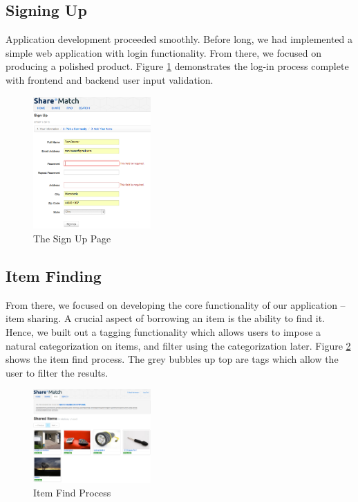 \documentclass{acm_proc_article-sp}
\begin{document}
\subsection{Signing Up}
Application development proceeded smoothly. Before long, we had implemented a simple web application with login functionality.
From there, we focused on producing a polished product. Figure \ref{fig:SignUpPage.png} demonstrates the log-in process
complete with frontend and backend user input validation.
\begin{figure}[h]
\begin{centering}
\includegraphics[width=0.4\textwidth]{SignUpPage.png} %
\caption{The Sign Up Page}
\label{fig:SignUpPage.png}
\end{centering}
\end{figure}

\subsection{Item Finding}
From there, we focused on developing the core functionality of our application -- item sharing. A crucial aspect of borrowing
an item is the ability to find it. Hence, we built out a tagging functionality which allows users to impose a natural
categorization on items, and filter using the categorization later. Figure \ref{fig:ItemSearch.png} shows the item find
process. The grey bubbles up top are tags which allow the user to filter the results.
\begin{figure}[h]
\begin{centering}
\includegraphics[width=0.4\textwidth]{ItemSearch.png}
\caption{Item Find Process}
\label{fig:ItemSearch.png}
\end{centering}
\end{figure}
\end{document}
